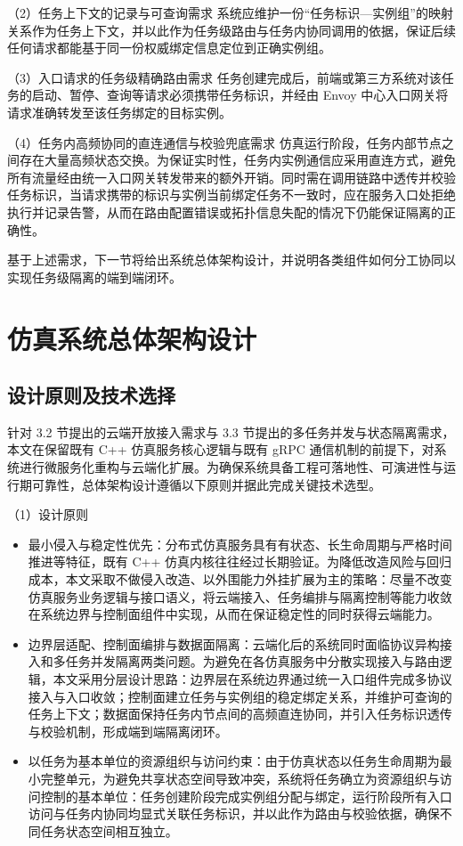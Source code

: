 \documentclass[lang=chs, degree=master, blindreview=true, winfonts=true, academic=false]{yanputhesis}
\begin{document}
（2）任务上下文的记录与可查询需求
系统应维护一份“任务标识—实例组”的映射关系作为任务上下文，并以此作为任务级路由与任务内协同调用的依据，保证后续任何请求都能基于同一份权威绑定信息定位到正确实例组。

（3）入口请求的任务级精确路由需求
任务创建完成后，前端或第三方系统对该任务的启动、暂停、查询等请求必须携带任务标识，并经由 Envoy 中心入口网关将请求准确转发至该任务绑定的目标实例。

（4）任务内高频协同的直连通信与校验兜底需求
仿真运行阶段，任务内部节点之间存在大量高频状态交换。为保证实时性，任务内实例通信应采用直连方式，避免所有流量经由统一入口网关转发带来的额外开销。同时需在调用链路中透传并校验任务标识，当请求携带的标识与实例当前绑定任务不一致时，应在服务入口处拒绝执行并记录告警，从而在路由配置错误或拓扑信息失配的情况下仍能保证隔离的正确性。

基于上述需求，下一节将给出系统总体架构设计，并说明各类组件如何分工协同以实现任务级隔离的端到端闭环。




\section{仿真系统总体架构设计}
\subsection{设计原则及技术选择}
针对 3.2 节提出的云端开放接入需求与 3.3 节提出的多任务并发与状态隔离需求，本文在保留既有 C++ 仿真服务核心逻辑与既有 gRPC 通信机制的前提下，对系统进行微服务化重构与云端化扩展。为确保系统具备工程可落地性、可演进性与运行期可靠性，总体架构设计遵循以下原则并据此完成关键技术选型。

（1）设计原则

\begin{itemize}
\item 最小侵入与稳定性优先：分布式仿真服务具有有状态、长生命周期与严格时间推进等特征，既有 C++ 仿真内核往往经过长期验证。为降低改造风险与回归成本，本文采取不做侵入改造、以外围能力外挂扩展为主的策略：尽量不改变仿真服务业务逻辑与接口语义，将云端接入、任务编排与隔离控制等能力收敛在系统边界与控制面组件中实现，从而在保证稳定性的同时获得云端能力。
\item 边界层适配、控制面编排与数据面隔离：云端化后的系统同时面临协议异构接入和多任务并发隔离两类问题。为避免在各仿真服务中分散实现接入与路由逻辑，本文采用分层设计思路：边界层在系统边界通过统一入口组件完成多协议接入与入口收敛；控制面建立任务与实例组的稳定绑定关系，并维护可查询的任务上下文；数据面保持任务内节点间的高频直连协同，并引入任务标识透传与校验机制，形成端到端隔离闭环。
\item 以任务为基本单位的资源组织与访问约束：由于仿真状态以任务生命周期为最小完整单元，为避免共享状态空间导致冲突，系统将任务确立为资源组织与访问控制的基本单位：任务创建阶段完成实例组分配与绑定，运行阶段所有入口访问与任务内协同均显式关联任务标识，并以此作为路由与校验依据，确保不同任务状态空间相互独立。
\end{itemize}
\end{document}
